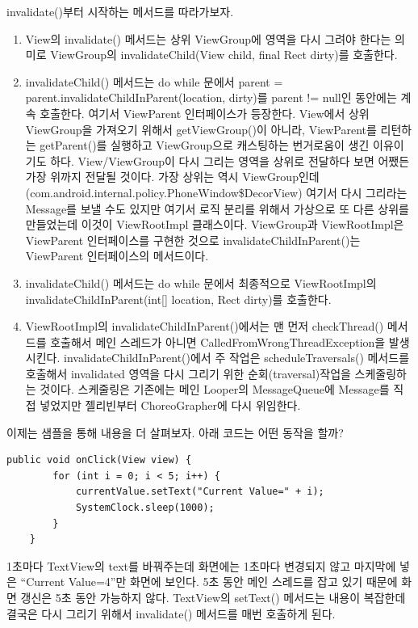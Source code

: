 invalidate()부터 시작하는 메서드를 따라가보자.
\begin{enumerate}
\item View의 invalidate() 메서드는 상위 ViewGroup에 영역을 다시 그려야 한다는 의미로 ViewGroup의 invalidateChild(View child, final Rect dirty)를 호출한다. 

\item invalidateChild() 메서드는 do while 문에서 parent = parent.invalidateChildInParent(location, dirty)를 parent != null인 동안에는 계속 호출한다. 여기서 ViewParent 인터페이스가 등장한다. View에서 상위 ViewGroup을 가져오기 위해서 getViewGroup()이 아니라, ViewParent를 리턴하는 getParent()를 실행하고 ViewGroup으로 캐스팅하는 번거로움이 생긴 이유이기도 하다. 
View/ViewGroup이 다시 그리는 영역을 상위로 전달하다 보면 어쨌든 가장 위까지 전달될 것이다. 가장 상위는 역시 ViewGroup인데(com.android.internal.policy.PhoneWindow\$DecorView) 여기서 다시 그리라는 Message를 보낼 수도 있지만 여기서 로직 분리를 위해서 가상으로 또 다른 상위를 만들었는데 이것이 ViewRootImpl 클래스이다.
ViewGroup과 ViewRootImpl은 ViewParent 인터페이스를 구현한 것으로 invalidateChildInParent()는 ViewParent 인터페이스의 메서드이다.

\item invalidateChild() 메서드는 do while 문에서 최종적으로 ViewRootImpl의 invalidateChildInParent(int[] location, Rect dirty)를 호출한다.

\item ViewRootImpl의 invalidateChildInParent()에서는 맨 먼저 checkThread() 메서드를 호출해서 메인 스레드가 아니면 CalledFromWrongThreadException을 발생시킨다.
invalidateChildInParent()에서 주 작업은 scheduleTraversals() 메서드를 호출해서 invalidated 영역을 다시 그리기 위한 순회(traversal)작업을 스케줄링하는 것이다. 스케줄링은 기존에는 메인 Looper의 MessageQueue에 Message를 직접 넣었지만 젤리빈부터 ChoreoGrapher에 다시 위임한다.
\end{enumerate}

이제는 샘플을 통해 내용을 더 살펴보자. 아래 코드는 어떤 동작을 할까?
\begin{lstlisting}[frame=single] 
	public void onClick(View view) {
		for (int i = 0; i < 5; i++) {
			currentValue.setText("Current Value=" + i);
			SystemClock.sleep(1000);
		}
	}
\end{lstlisting}
1초마다 TextView의 text를 바꿔주는데 화면에는 1초마다 변경되지 않고 마지막에 넣은 ``Current Value=4''만 화면에 보인다.
5초 동안 메인 스레드를 잡고 있기 때문에 화면 갱신은 5초 동안 가능하지 않다. 
TextView의 setText() 메서드는 내용이 복잡한데 결국은 다시 그리기 위해서 invalidate() 메서드를 매번 호출하게 된다.\\

